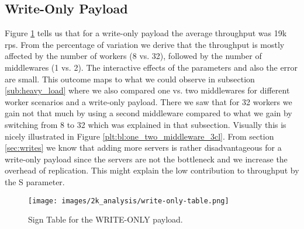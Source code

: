 \documentclass[11pt,a4paper]{article}
\begin{document}
\subsection{Write-Only Payload}
Figure \ref{img:2k:wo} tells us that for a write-only payload the average throughput was 19k rps. From the percentage of variation we derive that the throughput is mostly affected by the number of workers (8 vs. 32), followed by the number of middlewares (1 vs. 2). The interactive effects of the parameters and also the error are small. This outcome maps to what we could observe in subsection \ref{sub:heavy_load} where we also compared one vs. two middlewares for different worker scenarios and a write-only payload. There we saw that for 32 workers we gain not that much by using a second middleware compared to what we gain by switching from 8 to 32 which was explained in that subsection. Visually this is nicely illustrated in Figure \ref{plt:bl:one_two_middleware_3cl}. From section \ref{sec:writes} we know that adding more servers is rather disadvantageous for a write-only payload since the servers are not the bottleneck and we increase the overhead of replication. This might explain the low contribution to throughput by the S parameter. 

\begin{figure}[H]
    \centering
    \texttt{[image: images/2k\_analysis/write-only-table.png]}
    \caption{Sign Table for the WRITE-ONLY payload.}
    \label{img:2k:wo}
\end{figure}
\end{document}
